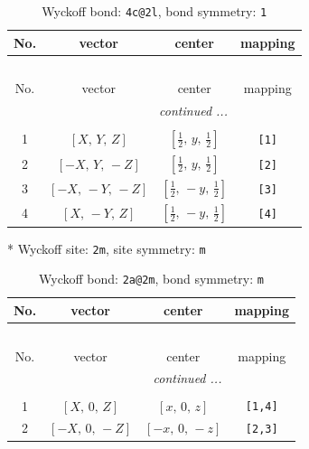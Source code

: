 \documentclass[fleqn,8pt]{jsarticle}
\begin{document}
\begin{longtable}{cccc}
\caption{Wyckoff bond: {\tt 4c@2l}, bond symmetry: {\tt 1}}
 \\
 \hline \hline
No. & vector & center & mapping \\ \hline \endfirsthead

\multicolumn{3}{l}{\tablename\ \thetable{}} \\
 \hline \hline
No. & vector & center & mapping \\ \hline \endhead

 \hline \hline
\multicolumn{3}{r}{\footnotesize\it continued ...} \\ \endfoot

 \hline \hline
\multicolumn{3}{r}{} \\ \endlastfoot

1 & $\left[ X,\, Y,\, Z \right]$ & $\left[ \frac{1}{2},\, y,\, \frac{1}{2} \right]$ & {\tt [1]} \\ \hline
2 & $\left[ - X,\, Y,\, - Z \right]$ & $\left[ \frac{1}{2},\, y,\, \frac{1}{2} \right]$ & {\tt [2]} \\ \hline
3 & $\left[ - X,\, - Y,\, - Z \right]$ & $\left[ \frac{1}{2},\, - y,\, \frac{1}{2} \right]$ & {\tt [3]} \\ \hline
4 & $\left[ X,\, - Y,\, Z \right]$ & $\left[ \frac{1}{2},\, - y,\, \frac{1}{2} \right]$ & {\tt [4]} \\
\end{longtable}
* Wyckoff site: {\tt 2m}, site symmetry: {\tt m}
\renewcommand{\arraystretch}{1.2}
\begin{longtable}{cccc}
\caption{Wyckoff bond: {\tt 2a@2m}, bond symmetry: {\tt m}}
 \\
 \hline \hline
No. & vector & center & mapping \\ \hline \endfirsthead

\multicolumn{3}{l}{\tablename\ \thetable{}} \\
 \hline \hline
No. & vector & center & mapping \\ \hline \endhead

 \hline \hline
\multicolumn{3}{r}{\footnotesize\it continued ...} \\ \endfoot

 \hline \hline
\multicolumn{3}{r}{} \\ \endlastfoot

1 & $\left[ X,\, 0,\, Z \right]$ & $\left[ x,\, 0,\, z \right]$ & {\tt [1,4]} \\ \hline
2 & $\left[ - X,\, 0,\, - Z \right]$ & $\left[ - x,\, 0,\, - z \right]$ & {\tt [2,3]} \\
\end{longtable}
\end{document}
